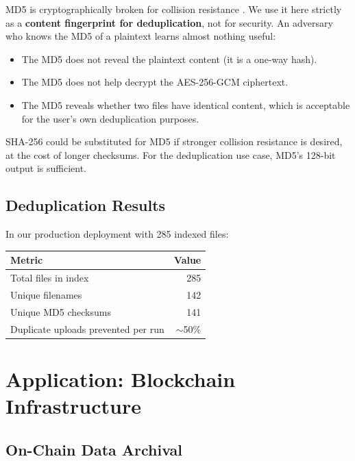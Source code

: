 \documentclass[11pt,a4paper]{article}
\begin{document}
MD5 is cryptographically broken for collision resistance \cite{wang2005break}. We use it here strictly as a \textbf{content fingerprint for deduplication}, not for security. An adversary who knows the MD5 of a plaintext learns almost nothing useful:

\begin{itemize}
    \item The MD5 does not reveal the plaintext content (it is a one-way hash).
    \item The MD5 does not help decrypt the AES-256-GCM ciphertext.
    \item The MD5 reveals whether two files have identical content, which is acceptable for the user's own deduplication purposes.
\end{itemize}

SHA-256 could be substituted for MD5 if stronger collision resistance is desired, at the cost of longer checksums. For the deduplication use case, MD5's 128-bit output is sufficient.

\subsection{Deduplication Results}

In our production deployment with 285 indexed files:

\begin{center}
\begin{tabularx}{0.7\textwidth}{Xr}
\hline
\textbf{Metric} & \textbf{Value} \\
\hline
Total files in index & 285 \\
Unique filenames & 142 \\
Unique MD5 checksums & 141 \\
Duplicate uploads prevented per run & $\sim$50\% \\
\hline
\end{tabularx}
\end{center}

\section{Application: Blockchain Infrastructure}

\subsection{On-Chain Data Archival}
\end{document}
